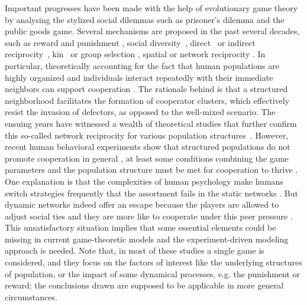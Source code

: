 \documentclass[doublecol]{epl2}
\begin{document}
Important progresses have been made with the help of evolutionary game theory~\cite{Nowak2004Evolutionary} by analysing the stylized social dilemmas such as prisoner's dilemma and the public goods game.
Several mechanisms are proposed \cite{Nowak2006Five} in the past several decades, such as reward and punishment \cite{Sigmund2001Reward}, social diversity~\cite{Santos2008Social}, direct~\cite{trivers1971evolution} or indirect reciprocity~\cite{nowak1998evolution}, kin~\cite{hamilton1964genetical} or group selection \cite{keller1999levels,Queller1964Group}, spatial or network reciprocity \cite{nowak1992evolutionary}. In particular, theoretically accounting for the fact that human populations are highly organized and individuals interact repeatedly with their immediate neighbors can support cooperation \cite{nowak1992evolutionary}.  The rationale behind is that a structured neighborhood facilitates the formation of cooperator clusters, which effectively resist the invasion of defectors, as opposed to the well-mixed scenario. The ensuing years have witnessed a wealth of theoretical studies that further confirm this so-called network reciprocity for various population structures~\cite{szabo2007evolutionary}. However, recent human behavioral experiments show that structured populations do not promote cooperation in general \cite{Gracial2012Human,Carlos2012Heterogeneous}, at least some conditions combining the game parameters and the population structure must be met for cooperation to thrive \cite{Rand2014Static}. One explanation is that the complexities of human psychology make humans switch strategies frequently that the assortment fails in the static networks \cite{traulsen2010human}. But dynamic networks indeed offer an escape because the players are allowed to adjust social ties and they are more like to cooperate under this peer pressure \cite{Rand2011Dynamic, Katrin2011Co}. This unsatisfactory situation implies that some essential elements could be missing in current game-theoretic models and the experiment-driven modeling approach is needed. Note that, in most of these studies a single game is considered, and they focus on the factors of interest like the underlying structures of population, or the impact of some dynamical processes, e.g. the punishment or reward; the conclusions drawn are supposed to be applicable in more general circumstances.
\end{document}
